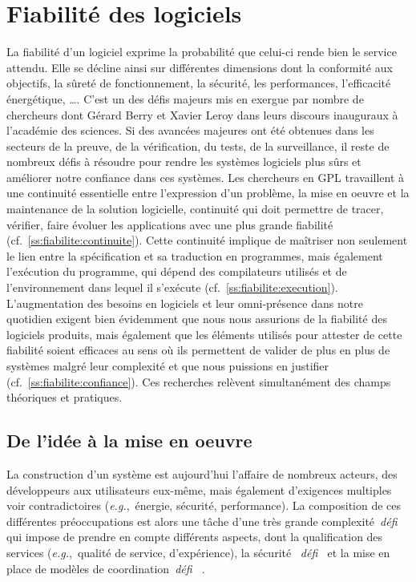 \documentclass[11pt]{article}
\newcommand{\eg}[0]{\emph{e.g.},~}
\newcommand{\cf}[0]{cf.~}
\newcommand{\defi}[1]{\emph{défi~%
\cite{#1}}}
\begin{document}
\section{Fiabilité des logiciels\label{s:fiabilite}}
La fiabilité d'un logiciel exprime la probabilité que celui-ci rende bien le service attendu. Elle se décline ainsi sur différentes dimensions dont la conformité aux objectifs, la sûreté de fonctionnement, la sécurité, les performances, l'efficacité énergétique, \ldots. 
C'est un des défis majeurs mis en exergue par nombre de chercheurs dont Gérard Berry et Xavier Leroy dans leurs discours inauguraux à l'académie des sciences. Si des avancées majeures ont été obtenues dans les secteurs de la preuve, de la vérification, du tests, de la surveillance, il reste de nombreux défis à résoudre pour rendre les systèmes logiciels plus sûrs et améliorer notre confiance dans ces systèmes. 
Les chercheurs en GPL travaillent à une continuité essentielle entre l'expression d'un problème, la mise en oeuvre et la maintenance de la solution logicielle, continuité qui doit permettre de tracer, vérifier, faire évoluer les applications avec une plus grande fiabilité (cf.~\ref{ss:fiabilite:continuite}). Cette continuité implique de maîtriser non seulement le lien entre la spécification et sa traduction en programmes, mais également l'exécution du programme, qui dépend des compilateurs utilisés et de l'environnement dans lequel il s'exécute (\cf\ref{ss:fiabilite:execution}). 
L'augmentation des besoins en logiciels et leur omni-présence dans notre quotidien exigent bien évidemment que nous nous assurions de la fiabilité des logiciels produits, mais également que les éléments utilisés pour attester de cette fiabilité soient efficaces au sens où ils permettent de valider de plus en plus de systèmes malgré leur complexité et  que nous puissions en justifier (\cf\ref{ss:fiabilite:confiance}).
Ces recherches relèvent simultanément des champs théoriques et pratiques.


\subsection{De l'idée à la mise en oeuvre\label{ss:fiabilite:continuite}} 
La construction d'un système est aujourd'hui l'affaire de nombreux acteurs, des développeurs aux utilisateurs eux-même, mais également d'exigences multiples voir contradictoires (\eg énergie, sécurité, performance). La composition de ces différentes préoccupations est alors une tâche d'une très grande complexité~\defi{argumentation} qui impose de prendre en compte différents aspects, dont la qualification des services (\eg qualité de service, d'expérience), la sécurité
~\defi{securite} et la mise en place de modèles de coordination~\defi{reconfiguration}.
\end{document}
